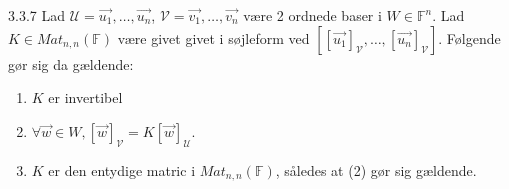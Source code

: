 \begin{proposition}{3.3.7}
	Lad $\mathcal{U} = {\vec{u_1}, \ldots, \vec{u_n}}$, $\mathcal{V} = {
	\vec{v_1}, \ldots, \vec{v_n}}$ 
	være 2 ordnede baser i $W \in \mathbb{F}^n$. 
	Lad $K \in Mat_{n,n}(\mathbb{F})$ være givet givet i søjleform ved $[[
	\vec{u_1}]_{\mathcal{V}}, \ldots, [\vec{u_n}]_{\mathcal{V}}]$.
	Følgende gør sig da gældende:
	\begin{enumerate}
		\item $K$ er invertibel
		\item $\forall \vec{w} \in W, [\vec{w}]_{\mathcal{V}} = 
			K[\vec{w}]_{\mathcal{U}}$.
		\item $K$ er den entydige matric i $Mat_{n,n}(\mathbb{F})$, således at
			(2) gør sig gældende.
	\end{enumerate}
\end{proposition}

